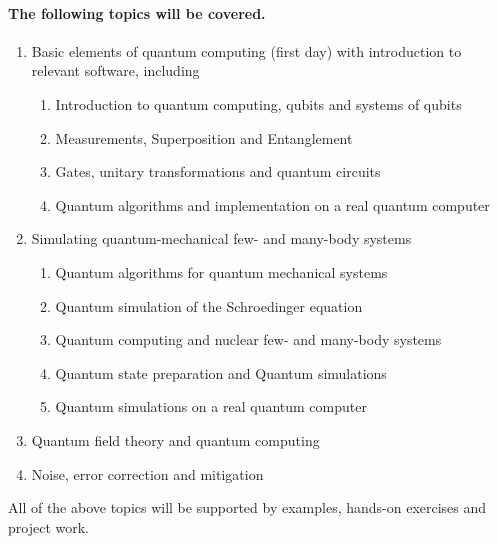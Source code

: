 \documentclass[%
oneside,                 %
final,                   %
10pt]{article}
\begin{document}
\paragraph{The following topics will be covered.}
\begin{enumerate}
\item Basic elements of quantum computing (first day) with introduction to relevant software, including
\begin{enumerate}

  \item Introduction to quantum computing, qubits and systems of qubits

  \item Measurements, Superposition and Entanglement

  \item Gates, unitary transformations and quantum circuits

  \item Quantum algorithms and implementation on a real quantum computer

\end{enumerate}

\noindent
\item Simulating quantum-mechanical few- and many-body systems
\begin{enumerate}

  \item Quantum algorithms for quantum mechanical systems

  \item Quantum simulation of the Schroedinger equation

  \item Quantum computing and nuclear few- and many-body systems

  \item Quantum state preparation and Quantum simulations

  \item Quantum simulations on a real quantum computer

\end{enumerate}

\noindent
\item Quantum field theory and quantum computing

\item Noise, error correction and mitigation
\end{enumerate}

\noindent
All of the above topics will be supported by examples, hands-on exercises and project work.
\end{document}
